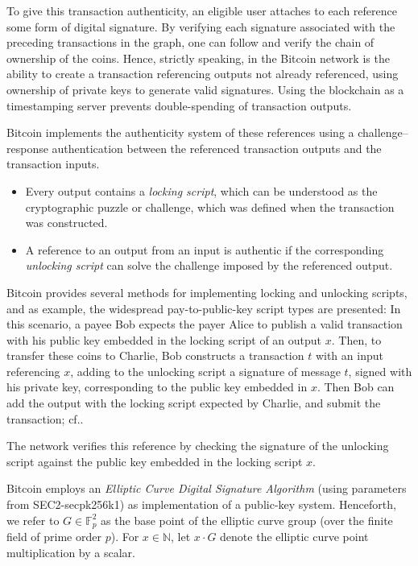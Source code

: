 \documentclass[a4paper,11pt,titlepage]{scrbook}
\begin{document}
To give this transaction authenticity, an eligible user attaches to each reference some form of digital signature.
By verifying each signature associated with the preceding transactions in the graph, one can follow and verify the chain of ownership of the coins.
Hence, strictly speaking,  in the Bitcoin network is the ability to create a transaction referencing outputs not already referenced, using ownership of private keys to generate valid signatures.
Using the blockchain as a timestamping server prevents double-spending of transaction outputs.

Bitcoin implements the authenticity system of these references using a challenge–response authentication between the referenced transaction outputs and the transaction inputs.

\begin{itemize}
    \item Every output contains a \emph{locking script}, which can be understood as the cryptographic puzzle or challenge, which was defined when the transaction was constructed.
    \item A reference to an output from an input is authentic if the corresponding \emph{unlocking script} can solve the challenge imposed by the referenced output.
\end{itemize}

Bitcoin provides several methods for implementing locking and unlocking scripts, and as example, the widespread pay-to-public-key script types are presented: In this scenario, a payee Bob expects the payer Alice to publish a valid transaction with his public key embedded in the locking script of an output $x$.
Then, to transfer these coins to Charlie, Bob constructs a transaction $t$ with an input referencing $x$, adding to the unlocking script a signature of message $t$, signed with his private key, corresponding to the public key embedded in $x$.
Then Bob can add the output with the locking script expected by Charlie, and submit the transaction; cf.\@ \cite[Chap.~6--7]{antonopoulos_mastering_2017}.


The network verifies this reference by checking the signature of the unlocking script against the public key embedded in the locking script $x$.


Bitcoin employs an \emph{Elliptic Curve Digital Signature Algorithm} (using parameters from SEC2-secpk256k1) as implementation of a public-key system.
Henceforth, we refer to $G\in \mathbb{F}_p^2$ as the base point of the elliptic curve group (over the finite field of prime order $p$). For $x\in \mathbb{N}$, let $x\cdot G$ denote the elliptic curve point multiplication by a scalar.
\end{document}
